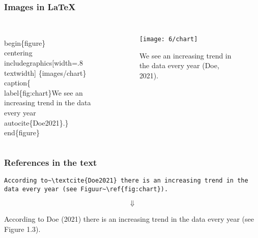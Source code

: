 \documentclass[aspectratio=169]{beamer}
\begin{document}
\begin{frame}
  \frametitle{Images in {\LaTeX}}

  \begin{columns}[c]

\begin{semiverbatim}
\small
\alert<1>{\\begin\{figure\}}
  \alert<2>{\\centering}
  \alert<3>{\\includegraphics[width=.8\\textwidth]
    \{images/chart\}}
 \alert<4>{\\caption\{\alert<5>{\\label\{fig:chart\}}We see an increasing trend in
     the data every year \alert<6>{\\autocite\{Doe2021\}}.\}}
\alert<1>{\\end\{figure\}}
\end{semiverbatim}

    \begin{figure}
      \centering
      \texttt{[image: 6/chart]}
      \caption{\label{fig:chart} We see an increasing trend in the data every year (Doe, 2021).}
    \end{figure}

  \end{columns}

\end{frame}

\begin{frame}[fragile]
  \frametitle{References in the text}

  \begin{verbatim}
According to~\textcite{Doe2021} there is an increasing trend in the data every year (see Figuur~\ref{fig:chart}).
\end{verbatim}

  \[\Downarrow\]

  \bigskip

  According to Doe (2021) there is an increasing trend in 
  the data every year (see Figure 1.3).

\end{frame}
\end{document}
